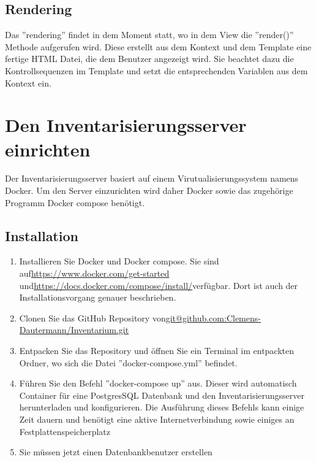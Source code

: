 \documentclass{article}
\begin{document}
\subsection{Rendering}
Das ''rendering'' findet in dem Moment statt, wo in dem View die ''render()'' Methode aufgerufen wird. Diese erstellt aus dem Kontext und dem Template eine fertige HTML Datei, die dem Benutzer angezeigt wird. Sie beachtet dazu die Kontrollsequenzen im Template und setzt die entsprechenden Variablen aus dem Kontext ein.

\section{Den Inventarisierungsserver einrichten}
Der Inventarisierungsserver basiert auf einem Virutualisierungssystem namens Docker. Um den Server einzurichten wird daher Docker sowie das zugehörige Programm Docker compose benötigt.
\subsection{Installation}
\begin{enumerate}
	\item Installieren Sie Docker und Docker compose. Sie sind auf\newline \url{https://www.docker.com/get-started} und\newline \url{https://docs.docker.com/compose/install/}\newline verfügbar. Dort ist auch der Installationsvorgang genauer beschrieben. 
	\item Clonen Sie das GitHub Repository von\newline \url{git@github.com:Clemens-Dautermann/Inventarium.git}
	\item Entpacken Sie das Repository und öffnen Sie ein Terminal im entpackten Ordner, wo sich die Datei ''docker-compose.yml'' befindet.
	\item Führen Sie den Befehl ''docker-compose up'' aus. Dieser wird automatisch Container für eine PostgresSQL Datenbank und den Inventarisierungsserver herunterladen und konfigurieren. Die Ausführung dieses Befehls kann einige Zeit dauern und benötigt eine aktive Internetverbindung sowie einiges an Festplattenspeicherplatz
	\item Sie müssen jetzt einen Datenbankbenutzer erstellen
\end{enumerate}
\end{document}
